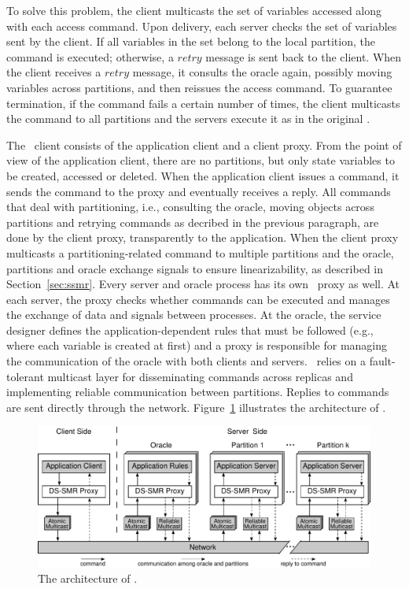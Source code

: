 To solve this problem, the client multicasts the set of variables accessed along with each access command.
Upon delivery, each server checks the set of variables sent by the client.
If all variables in the set belong to the local partition, the command is executed; otherwise, a $retry$ message is sent back to the client.
When the client receives a $retry$ message, it consults the oracle again, possibly moving variables across partitions, and then reissues the access command.
To guarantee termination, if the command fails a certain number of times, the client multicasts the command to all partitions and the servers execute it as in the original \ssmr{}.



The \dssmr\ client consists of the application client and a client proxy.
From the point of view of the application client, there are no partitions, but only state variables to be created, accessed or deleted.
When the application client issues a command, it sends the command to the proxy and eventually receives a reply.
All commands that deal with partitioning, i.e., consulting the oracle, moving objects across partitions and retrying commands as decribed in the previous paragraph, are done by the client proxy, transparently to the application.
When the client proxy multicasts a partitioning-related command to multiple partitions and the oracle, partitions and oracle exchange signals to ensure linearizability, as described in Section~\ref{sec:ssmr}.
Every server and oracle process has its own \dssmr\ proxy as well.
At each server, the proxy checks whether commands can be executed and manages the exchange of data and signals between processes.
At the oracle, the service designer defines the application-dependent rules that must be followed (e.g., where each variable is created at first) and a proxy is responsible for managing the communication of the oracle with both clients and servers.
\dssmr\ relies on a fault-tolerant multicast layer for disseminating commands across replicas and implementing reliable communication between partitions.
Replies to commands are sent directly through the network.
Figure~\ref{fig:arch} illustrates the architecture of \dssmr{}.

\begin{figure}
\begin{minipage}[b]{1.0\linewidth} %
\centering
      \includegraphics[width=0.65\linewidth]{figures/arch}
\end{minipage}
\caption{The architecture of \dssmr{}.}
\label{fig:arch}
\end{figure}

